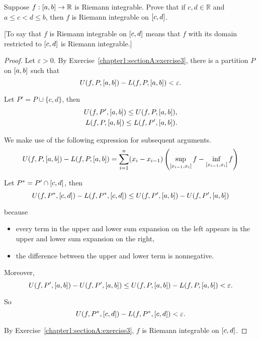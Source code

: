 \begin{exercise}\label{chapter1:sectionA:exercise9}
    Suppose $f: \left[{a,b}\right]\to\mathbb{R}$ is Riemann integrable. Prove that if $c, d\in\mathbb{R}$ and $a\leq c < d\leq b$, then $f$ is Riemann integrable on $\left[{c, d}\right]$.

        [To say that $f$ is Riemann integrable on $\left[{c,d}\right]$ means that $f$ with its domain restricted to $\left[{c,d}\right]$ is Riemann integrable.]
\end{exercise}

\begin{proof}
    Let $\varepsilon > 0$. By Exercise~\ref{chapter1:sectionA:exercise3}, there is a partition $P$ on $\left[{a, b}\right]$ such that
    \[
        U(f, P, \left[{a, b}\right]) - L(f, P, \left[{a, b}\right]) < \varepsilon.
    \]

    Let $P' = P\cup \{ c, d \}$, then
    \[
        \begin{split}
            U(f, P', \left[{a, b}\right]) \leq U(f, P, \left[{a, b}\right]), \\
            L(f, P, \left[{a, b}\right]) \leq L(f, P', \left[{a, b}\right]).
        \end{split}
    \]

    We make use of the following expression for subsequent arguments.
    \[
        U(f, P, \left[{a, b}\right]) - L(f, P, \left[{a, b}\right]) = \sum^{n}_{i=1}(x_{i} - x_{i-1})\left(\sup\limits_{\left[{x_{i-1},x_{i}}\right]}f - \inf\limits_{\left[{x_{i-1},x_{i}}\right]}f\right)
    \]

    Let $P^{*} = P'\cap \left[{c, d}\right]$, then
    \[
        U(f, P^{*}, \left[{c, d}\right]) - L(f, P^{*}, \left[{c, d}\right]) \leq U(f, P', \left[{a, b}\right]) - U(f, P', \left[{a, b}\right])
    \]

    because
    \begin{itemize}
        \item every term in the upper and lower sum expansion on the left appears in the upper and lower sum expansion on the right,
        \item the difference between the upper and lower term is nonnegative.
    \end{itemize}

    Moreover,
    \[
        U(f, P', \left[{a, b}\right]) - U(f, P', \left[{a, b}\right]) \leq U(f, P, \left[{a, b}\right]) - L(f, P, \left[{a, b}\right]) < \varepsilon.
    \]

    So
    \[
        U(f, P^{*}, \left[{c, d}\right]) - L(f, P^{*}, \left[{c, d}\right]) < \varepsilon.
    \]

    By Exercise~\ref{chapter1:sectionA:exercise3}, $f$ is Riemann integrable on $\left[{c, d}\right]$.
\end{proof}
\newpage

